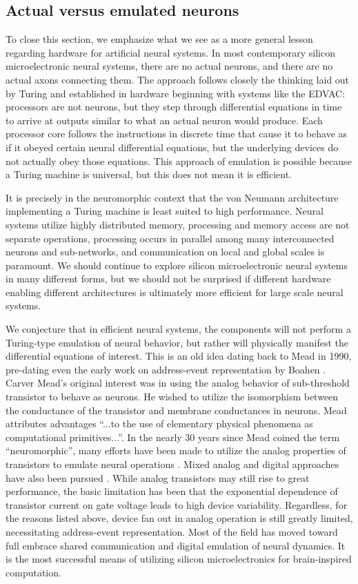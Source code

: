 \documentclass[twocolumn]{article}
\begin{document}
\subsection{Actual versus emulated neurons}
To close this section, we emphasize what we see as a more general lesson regarding hardware for artificial neural systems. In most contemporary silicon microelectronic neural systems, there are no actual neurons, and there are no actual axons connecting them. The approach follows closely the thinking laid out by Turing and established in hardware beginning with systems like the EDVAC: processors are not neurons, but they step through differential equations in time to arrive at outputs similar to what an actual neuron would produce. Each processor core follows the instructions in discrete time that cause it to behave as if it obeyed certain neural differential equations, but the underlying devices do not actually obey those equations. This approach of emulation is possible because a Turing machine is universal, but this does not mean it is efficient. 

It is precisely in the neuromorphic context that the von Neumann architecture implementing a Turing machine is least suited to high performance. Neural systems utilize highly distributed memory, processing and memory access are not separate operations, processing occurs in parallel among many interconnected neurons and sub-networks, and communication on local and global scales is paramount. We should continue to explore silicon microelectronic neural systems in many different forms, but we should not be surprised if different hardware enabling different architectures is ultimately more efficient for large scale neural systems. 

We conjecture that in efficient neural systems, the components will not perform a Turing-type emulation of neural behavior, but rather will physically manifest the differential equations of interest. This is an old idea \cite{me1990} dating back to Mead in 1990, pre-dating even the early work on address-event representation by Boahen \cite{bo2000}. Carver Mead's original interest was in using the analog behavior of sub-threshold transistor to behave as neurons. He wished to utilize the isomorphism between the conductance of the transistor and membrane conductances in neurons. Mead attributes advantages ``...to the use of elementary physical phenomena as computational primitives...''. In the nearly 30 years since Mead coined the term ``neuromorphic'', many efforts have been made to utilize the analog properties of transistors to emulate neural operations \cite{hama2013}. Mixed analog and digital approaches have also been pursued \cite{}. While analog transistors may still rise to great performance, the basic limitation has been that the exponential dependence of transistor current on gate voltage leads to high device variability. Regardless, for the reasons listed above, device fan out in analog operation is still greatly limited, necessitating address-event representation. Most of the field has moved toward full embrace shared communication and digital emulation of neural dynamics. It is the most successful means of utilizing silicon microelectronics for brain-inspired computation.
\end{document}
